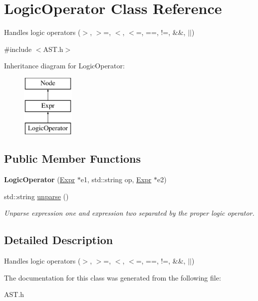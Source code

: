 \hypertarget{classLogicOperator}{\section{Logic\-Operator Class Reference}
\label{classLogicOperator}
}


Handles logic operators ($>$, $>$=, $<$, $<$=, ==, !=, \&\&, $\vert$$\vert$)  




{\ttfamily \#include $<$A\-S\-T.\-h$>$}

Inheritance diagram for Logic\-Operator\-:\begin{figure}[H]
\begin{center}
\leavevmode
\includegraphics[height=3.000000cm]{classLogicOperator}
\end{center}
\end{figure}
\subsection*{Public Member Functions}
\begin{DoxyCompactItemize}
\item 
\hypertarget{classLogicOperator_a2087e8fe4e93fcdbafd22ae776132cae}{{\bfseries Logic\-Operator} (\hyperlink{classExpr}{Expr} $\ast$e1, std\-::string op, \hyperlink{classExpr}{Expr} $\ast$e2)}\label{classLogicOperator_a2087e8fe4e93fcdbafd22ae776132cae}

\item 
\hypertarget{classLogicOperator_a43c2cc6c8999c69c561e93f262a87da9}{std\-::string \hyperlink{classLogicOperator_a43c2cc6c8999c69c561e93f262a87da9}{unparse} ()}\label{classLogicOperator_a43c2cc6c8999c69c561e93f262a87da9}

\begin{DoxyCompactList}\small\item\em Unparse expression one and expression two separated by the proper logic operator. \end{DoxyCompactList}\end{DoxyCompactItemize}


\subsection{Detailed Description}
Handles logic operators ($>$, $>$=, $<$, $<$=, ==, !=, \&\&, $\vert$$\vert$) 

The documentation for this class was generated from the following file\-:\begin{DoxyCompactItemize}
\item 
A\-S\-T.\-h\end{DoxyCompactItemize}
